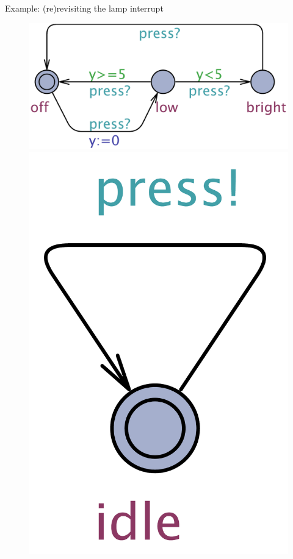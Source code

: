 \documentclass{beamer}
\begin{document}
\begin{slide}{Example: (re)revisiting the lamp interrupt}
\small

\begin{figure}[htb]
  \centering
  \includegraphics[scale=0.25]{./images/Lamp.pdf}
  \includegraphics[scale=0.09]{./images/User.pdf}\\
\end{figure}



\end{slide}
\end{document}
